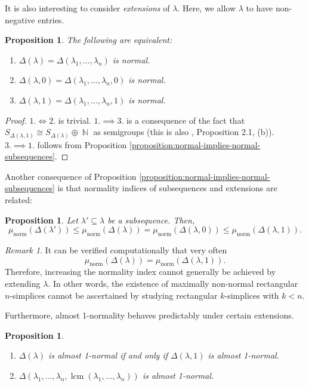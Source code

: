\documentclass[a4paper,11pt]{amsart}
\theoremstyle{plain}
\newtheorem{proposition}[theorem]{Proposition}
\theoremstyle{definition}
\theoremstyle{remark}
\newtheorem{remark}[theorem]{Remark}
\DeclareMathOperator{\NN}{\mathbb{N}}
\DeclareMathOperator{\lcm}{lcm}
\DeclareMathOperator{\norm}{norm}
\begin{document}
It is also interesting to consider \emph{extensions} of $\lambda$. Here, we allow $\lambda$ to have non-negative entries.

\begin{proposition}\label{proposition:normality-extensions}
    The following are equivalent:
    \begin{enumerate}[1.]
        \item $\Delta(\lambda) = \Delta(\lambda_1, \ldots, \lambda_n)$ is normal.
        \item $\Delta(\lambda, 0) = \Delta(\lambda_1, \ldots, \lambda_n, 0)$ is normal.
        \item $\Delta(\lambda, 1) = \Delta(\lambda_1, \ldots, \lambda_n, 1)$ is normal.
    \end{enumerate}
\end{proposition}

\begin{proof}
    $1. \iff 2.$ is trivial. $1. \implies 3.$ is a consequence of the fact that $S_{\Delta(\lambda, 1)} \cong S_{\Delta(\lambda)} \oplus \NN$ as semigroups (this is also \cite{BrunsGubeladze:1999}, Proposition 2.1, (b)). $3. \implies 1.$ follows from Proposition \ref{proposition:normal-implies-normal-subsequences}.
\end{proof}

Another consequence of Proposition \ref{proposition:normal-implies-normal-subsequences} is that normality indices of subsequences and extensions are related:

\begin{proposition}
    Let $\lambda' \subseteq \lambda$ be a subsequence. Then,
    \[
    \mu_{\norm}(\Delta(\lambda')) \leq \mu_{\norm}(\Delta(\lambda)) = \mu_{\norm}(\Delta(\lambda, 0)) \leq \mu_{\norm}(\Delta(\lambda, 1)).
    \]
\end{proposition}

\begin{remark}
    It can be verified computationally that very often
    \[
    \mu_{\norm}(\Delta(\lambda)) = \mu_{\norm}(\Delta(\lambda, 1)).
    \]
    Therefore, increasing the normality index cannot generally be achieved by extending $\lambda$. In other words, the existence of maximally non-normal rectangular $n$-simplices cannot be ascertained by studying rectangular $k$-simplices with $k < n$.
\end{remark}

Furthermore, almost 1-normality behaves predictably under certain extensions.

\begin{proposition} \hfill
    \begin{enumerate}[1.]
        \item $\Delta(\lambda)$ is almost 1-normal if and only if $\Delta(\lambda, 1)$ is almost 1-normal.
        \item $\Delta(\lambda_1, \ldots, \lambda_n, \lcm(\lambda_1, \ldots, \lambda_n))$ is almost 1-normal.
    \end{enumerate}
\end{proposition}
\end{document}
